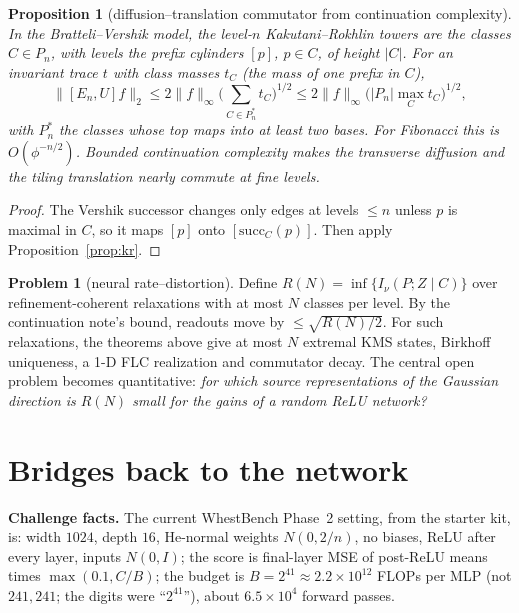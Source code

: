 \documentclass[11pt]{article}
\newtheorem{proposition}[theorem]{Proposition}
\theoremstyle{definition}
\newtheorem{problem}[theorem]{Problem}
\theoremstyle{remark}
\begin{document}
\begin{proposition}[diffusion--translation commutator from continuation complexity]\label{prop:complexity}
In the Bratteli--Vershik model, the level-$n$ Kakutani--Rokhlin towers are the classes $C\in P_n$, with levels the prefix cylinders $[p]$, $p\in C$, of height $|C|$. For an invariant trace $t$ with class masses $t_C$ (the mass of one prefix in $C$),
\[\|[E_n,U]f\|_2\le2\|f\|_\infty\Big(\sum_{C\in P_n^*}t_C\Big)^{1/2}\le2\|f\|_\infty\big(|P_n|\max_Ct_C\big)^{1/2},\]
with $P_n^*$ the classes whose top maps into at least two bases. For Fibonacci this is $O(\phi^{-n/2})$. Bounded continuation complexity makes the transverse diffusion and the tiling translation nearly commute at fine levels.
\end{proposition}

\begin{proof}
The Vershik successor changes only edges at levels $\le n$ unless $p$ is maximal in $C$, so it maps $[p]$ onto $[\mathrm{succ}_C(p)]$. Then apply Proposition~\ref{prop:kr}.
\end{proof}

\begin{problem}[neural rate--distortion]
Define $R(N)=\inf\{I_\nu(P;Z\mid C)\}$ over refinement-coherent relaxations with at most $N$ classes per level. By the continuation note's bound, readouts move by $\le\sqrt{R(N)/2}$. For such relaxations, the theorems above give at most $N$ extremal KMS states, Birkhoff uniqueness, a 1-D FLC realization and commutator decay. The central open problem becomes quantitative: \emph{for which source representations of the Gaussian direction is $R(N)$ small for the gains of a random ReLU network?}
\end{problem}

\section{Bridges back to the network}\label{sec:net}

\textbf{Challenge facts.} The current WhestBench Phase~2 setting, from the starter kit, is: width $1024$, depth $16$, He-normal weights $N(0,2/n)$, no biases, ReLU after every layer, inputs $N(0,I)$; the score is final-layer MSE of post-ReLU means times $\max(0.1,C/B)$; the budget is $B=2^{41}\approx2.2\times10^{12}$ FLOPs per MLP (not $241{,}241$; the digits were ``$2^{41}$''), about $6.5\times10^4$ forward passes.
\end{document}
